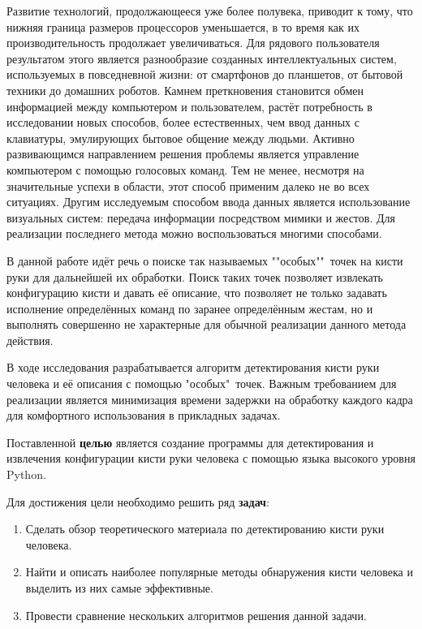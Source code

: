 Развитие технологий, продолжающееся уже более полувека, приводит к тому, что нижняя граница
размеров процессоров уменьшается, в то время как их производительность продолжает
увеличиваться. Для рядового пользователя результатом этого является разнообразие созданных
интеллектуальных систем, используемых в повседневной жизни: от смартфонов до планшетов, от
бытовой техники до домашних роботов. Камнем преткновения становится обмен информацией между
компьютером и пользователем, растёт потребность в исследовании новых способов, более 
естественных, чем ввод данных с клавиатуры, эмулирующих бытовое общение между людьми. 
Активно развивающимся направлением решения проблемы является управление компьютером с помощью 
голосовых команд. Тем не менее, несмотря на значительные успехи в области, этот способ
применим далеко не во всех ситуациях. Другим исследуемым способом ввода данных является
использование визуальных систем: передача информации посредством мимики и жестов. Для реализации
последнего метода можно воспользоваться многими способами. 

В данной работе идёт речь о поиске так называемых ""особых""\ точек на кисти руки 
для дальнейшей их обработки. Поиск таких точек позволяет извлекать конфигурацию кисти
и давать её описание, что позволяет не только задавать исполнение определённых 
команд по заранее определённым жестам, но и выполнять совершенно не характерные для обычной
реализации данного метода действия.

В ходе исследования разрабатывается алгоритм детектирования кисти руки человека и её описания
с помощью "особых"\ точек. Важным требованием для реализации является минимизация времени
задержки на обработку каждого кадра для комфортного использования в прикладных задачах.

Поставленной {\bf целью} является создание программы для детектирования и извлечения 
конфигурации кисти руки человека с помощью языка высокого уровня Python.

Для достижения цели необходимо решить ряд {\bf задач}:
\begin{enumerate}
	\item Сделать обзор теоретического материала по детектированию кисти руки человека.
	\item Найти и описать наиболее популярные методы обнаружения кисти человека и выделить из них самые эффективные.
	\item Провести сравнение нескольких алгоритмов решения данной задачи.
\end{enumerate}
